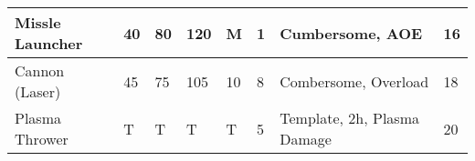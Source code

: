 \begin{table}[H]
\begin{tabular}{|l|l|l|l|l|l|l|l|}
        Missle Launcher       & 40                                                      & 80                                                      & 120                                                     & M    & 1   & Cumbersome, AOE                   & 16  \\ \hline
        Cannon (Laser)        & 45                                                      & 75                                                      & 105                                                     & 10   & 8   & Combersome, Overload              & 18  \\ \hline
        Plasma Thrower        & T                                                       & T                                                       & T                                                       & T    & 5   & Template, 2h, Plasma Damage       & 20  \\ \hline
        \end{tabular}
        \end{table}